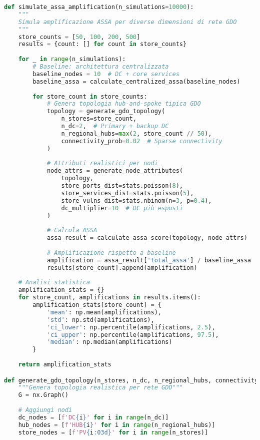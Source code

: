 \begin{lstlisting}[language=Python, caption=Simulazione Monte Carlo per Amplificazione ASSA]
def simulate_assa_amplification(n_simulations=10000):
    """
    Simula amplificazione ASSA per diverse dimensioni di rete GDO
    """
    store_counts = [50, 100, 200, 500]
    results = {count: [] for count in store_counts}
    
    for _ in range(n_simulations):
        # Baseline: architettura centralizzata
        baseline_nodes = 10  # DC + core services
        baseline_assa = calculate_centralized_assa(baseline_nodes)
        
        for store_count in store_counts:
            # Genera topologia hub-and-spoke tipica GDO
            topology = generate_gdo_topology(
                n_stores=store_count,
                n_dc=2,  # Primary + backup DC
                n_regional_hubs=max(2, store_count // 50),
                connectivity_prob=0.02  # Sparse connectivity
            )
            
            # Attributi realistici per nodi
            node_attrs = generate_node_attributes(
                topology,
                store_ports_dist=stats.poisson(8),
                store_services_dist=stats.poisson(5),
                store_vulns_dist=stats.nbinom(n=3, p=0.4),
                dc_multiplier=10  # DC più esposti
            )
            
            # Calcola ASSA
            assa_result = calculate_assa_score(topology, node_attrs)
            
            # Amplificazione rispetto a baseline
            amplification = assa_result['total_assa'] / baseline_assa
            results[store_count].append(amplification)
    
    # Analisi statistica
    amplification_stats = {}
    for store_count, amplifications in results.items():
        amplification_stats[store_count] = {
            'mean': np.mean(amplifications),
            'std': np.std(amplifications),
            'ci_lower': np.percentile(amplifications, 2.5),
            'ci_upper': np.percentile(amplifications, 97.5),
            'median': np.median(amplifications)
        }
    
    return amplification_stats

def generate_gdo_topology(n_stores, n_dc, n_regional_hubs, connectivity_prob):
    """Genera topologia realistica per rete GDO"""
    G = nx.Graph()
    
    # Aggiungi nodi
    dc_nodes = [f'DC{i}' for i in range(n_dc)]
    hub_nodes = [f'HUB{i}' for i in range(n_regional_hubs)]
    store_nodes = [f'PV{i:03d}' for i in range(n_stores)]
    

\end{lstlisting}
